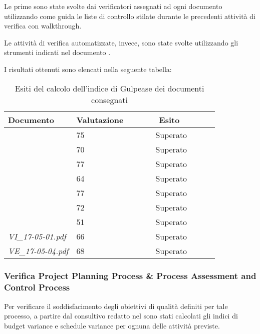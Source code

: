 		Le prime sono state svolte dai verificatori assegnati ad ogni documento utilizzando come guida le liste di controllo stilate durante le precedenti attività di verifica con walkthrough.

		Le attività di verifica automatizzate, invece, sono state svolte utilizzando gli strumenti indicati nel documento \NdP. 
		
		I risultati ottenuti sono elencati nella seguente tabella:
		\begin{table}[H]
		\begin{tabular}{|l|l|l|}
		\hline
		\textbf{Documento} 		&\textbf{Valutazione} &\textbf{~~~~~~Esito~~~~~~} \\
		\hline
		\PdQ 					&75		&~~~~~~Superato~~~~~~\\
		\NdP 					&70		&~~~~~~Superato~~~~~~\\
		\AdR 					&77		&~~~~~~Superato~~~~~~\\
		\PdP 					&64		&~~~~~~Superato~~~~~~\\
		\ST 					&77		&~~~~~~Superato~~~~~~\\
		\DP 					&72		&~~~~~~Superato~~~~~~\\	
		\Glossario 				&51		&~~~~~~Superato~~~~~~\\
		\textit{VI_17-05-01.pdf} 		&66	&~~~~~~Superato~~~~~~\\
		\textit{VE_17-05-04.pdf} 		&68		&~~~~~~Superato~~~~~~\\
			\hline
		\end{tabular}
		\caption{Esiti del calcolo dell'indice di Gulpease dei documenti consegnati}
		\end{table}
		
		\subsubsection{Verifica Project Planning Process \& Process Assessment and Control Process}
		Per verificare il soddisfacimento degli obiettivi di qualità definiti per tale processo, a partire dal consultivo redatto nel \PdP{} sono stati calcolati gli indici di budget variance e schedule variance per ognuna delle attività previste.
		

